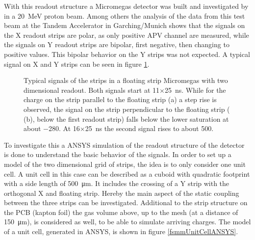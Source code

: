 \documentclass[
a4paper,                                %
twoside,                                %
BCOR1.4cm,                      %
10pt,                           %
headings=normal,                %
headsepline,                    %
clearplainpage, %
final,                                  %
div=14,
parskip=full,
openright,
bibliography=toc
]{scrreprt}
\begin{document}
With this readout structure a Micromegas detector was built and investigated by \cite{felixKthesis} in a \SI{20}{\MeV} proton beam. Among others the analysis of the data from this test beam at the Tandem Accelerator in Garching/Munich shows that the signals on the X readout strips are polar, as only positive APV channel are measured, while the signals on Y readout strips are bipolar, first negative, then changing to positive values. This bipolar behavior on the Y strips was not expected. A typical signal on X and Y strips can be seen in figure \ref{fsmm_2DRO_sig}.

\begin{figure}[H]	
	\centering
	\qquad
	\caption{Typical signals of the strips in a floating strip Micromegas with two dimensional readout. Both signals start at 11$\times$\SI{25}{\ns}. While for the charge on the strip parallel to the floating strip (a) a step rise is observed, the signal on the strip perpendicular to the floating strip ( (b), below the first readout strip) falls below the lower saturation at about $-$280. At 16$\times$\SI{25}{\ns} the second signal rises to about 500. \cite{felixKthesis}}
	\label{fsmm_2DRO_sig}
\end{figure}

To investigate this a ANSYS simulation of the readout structure of the detector is done to understand the basic behavior of the signals. In order to set up a model of the two dimensional grid of strips, the idea is to only consider one unit cell. A unit cell in this case can be described as a cuboid with quadratic footprint with a side length of \SI{500}{\micro\m}. It includes the crossing of a Y strip with the orthogonal X and floating strip. Hereby the main aspect of the static coupling between the three strips can be investigated. Additional to the strip structure on the PCB (kapton foil) the gas volume above, up to the mesh (at a distance of \SI{150}{\micro\m}), is considered as well, to be able to simulate arriving charges. The model of a unit cell, generated in ANSYS, is shown in figure \ref{fsmmUnitCellANSYS}.
\end{document}
